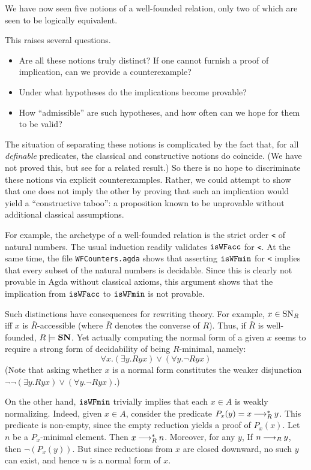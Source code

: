 We have now seen five notions of a well-founded relation, only two of which
are seen to be logically equivalent.

This raises several questions.
\begin{itemize}
\item Are all these notions truly distinct?  If one cannot furnish a proof of implication,
can we provide a counterexample?
\item Under what hypotheses do the implications become provable?
\item How ``admissible'' are such hypotheses, and how often can we hope for them to be valid?
\end{itemize}

The situation of separating these notions is complicated by the fact that, for all
\emph{definable} predicates, the classical and constructive notions do coincide.
(We have not proved this, but see \cite{Berardi} for a related result.)
So there is no hope to discriminate these notions via explicit counterexamples.
Rather, we could attempt to show that one does not imply the other by proving that
such an implication would yield a ``constructive taboo'': a proposition known to be
unprovable without additional classical assumptions.

For example, the archetype of a well-founded relation is the strict order \verb|<|
of natural numbers.  The usual induction readily validates $\mathtt{isWFacc}$ for \verb|<|.
  At the same time, the file \texttt{WFCounters.agda} shows that
asserting $\mathtt{isWFmin}$ for \verb|<| implies that every subset of the natural numbers is decidable.  Since this is clearly not provable in Agda without classical axioms,
this argument shows that the implication from $\mathtt{isWFacc}$ to $\mathtt{isWFmin}$ is not provable.

Such distinctions have consequences for rewriting theory.
For example, $x\in \mathrm{SN}_R$ iff $x$ is $\bar{R}$-accessible (where $\bar{R}$ denotes
the converse of $R$).  Thus, if $\bar{R}$ is well-founded, $R \models \mathbf{SN}$.
Yet actually computing the normal form of a given $x$ seems to require a
strong form of decidability of being $R$-minimal, namely:
\[
\tag{$\isMinDec$} \forall x. \left(\exists y. Ryx\right) \lor \left(\forall y. \lnot Ryx\right)
\]
(Note that asking whether $x$ is a normal form constitutes the weaker disjunction
$\lnot\lnot\left(\exists y. Ryx\right) \lor \left(\forall y. \lnot Ryx\right)$.)

On the other hand, $\mathtt{isWFmin}$ trivially implies that each $x \in A$ is weakly normalizing.
Indeed, given $x \in A$, consider the predicate $P_x(y) = x \mathbin{\longrightarrow_R^*} y$.
This predicate is non-empty, since the empty reduction yields a proof of $P_x(x)$.
Let $n$ be a $P_x$-minimal element.  Then $x \mathbin{\longrightarrow_R^*} n$.  Moreover, for any $y$,
If $n \mathbin{\longrightarrow_R} y$, then $\lnot(P_x(y))$.  But since reductions from $x$ are closed downward,
no such $y$ can exist, and hence $n$ is a normal form of $x$.

